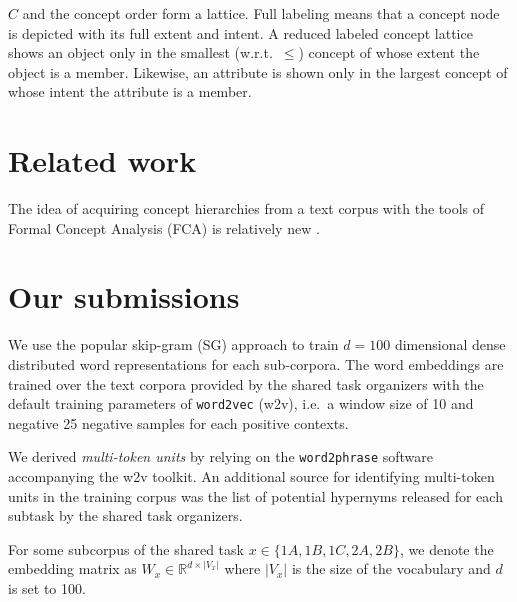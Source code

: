 \documentclass[11pt,a4paper]{article}
\begin{document}
$C$ and the concept order form a %
lattice.  
Full labeling means that a concept node is depicted with its full extent and
intent. A reduced labeled concept lattice shows an object only in the smallest
(w.r.t.~$\le$) concept of whose extent the object is a member.
Likewise, an attribute is shown only in the largest concept of whose intent the
attribute is a member.%

\section{Related work}

The idea of acquiring concept hierarchies from a text corpus with the tools of
Formal Concept Analysis (FCA) is relatively new \citep{Cimiano:2005}.

\section{Our submissions}

We use the popular skip-gram (SG) %
approach \citep{Mikolov:2013f} to train $d=100$ dimensional dense distributed
word representations for each sub-corpora. The word embeddings are trained over the text corpora provided by the shared task organizers with the default training parameters of \texttt{word2vec} (w2v), i.e.~a window size of 10 and negative 25 negative samples for each positive contexts.

We derived \emph{multi-token units} by relying on the \texttt{word2phrase} software accompanying the w2v toolkit. An additional source for identifying multi-token units in the training corpus was the list of potential hypernyms released for each subtask by the shared task organizers.

For some subcorpus of the shared task $x\in\{1A, 1B, 1C, 2A, 2B\}$, we denote
the embedding matrix as $W_x \in \mathbb{R}^{d \times \lvert V_x \rvert}$ where
$\lvert V_x \rvert$ is the size of the vocabulary and $d$ is set to 100.
\end{document}
